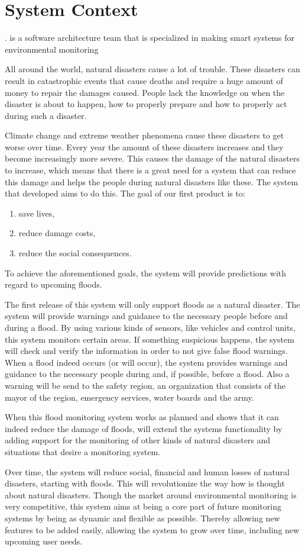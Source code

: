 \chapter{System Context}
\label{ch:context}

\CompanyName. is a software architecture team that is specialized in making smart systems for environmental monitoring

All around the world, natural disasters cause a lot of trouble. These disasters can result in catastrophic events that cause deaths and require a huge amount of money to repair the damages caused. People lack the knowledge on when the disaster is about to happen, how to properly prepare and how to properly act during such a disaster.

Climate change and extreme weather phenomena cause these disasters to get worse over time. Every year the amount of these disasters increases and they become increasingly more severe. This causes the damage of the natural disasters to increase, which means that there is a great need for a system that can reduce this damage and helps the people during natural disasters like these. The system that developed aims to do this.
The goal of our first product is to:
\begin{enumerate}
	\item save lives,
	\item reduce damage costs,
	\item reduce the social consequences.
\end{enumerate}

To achieve the aforementioned goals, the system will provide predictions with regard to upcoming floods.

The first release of this system will only support floods as a natural disaster. The system will provide warnings and guidance to the necessary people before and during a flood. By using various kinds of sensors, like vehicles and control units, this system monitors certain areas. If something suspicious happens, the system will check and verify the information in order to not give false flood warnings. When a flood indeed occurs (or will occur), the system provides warnings and guidance to the necessary people during and, if possible, before a flood. Also a warning will be send to the safety region, an organization that consists of the mayor of the region, emergency services, water boards and the army. 

When this flood monitoring system works as planned and shows that it can indeed reduce the damage of floods, \CompanyName will extend the systems functionality  by adding support for the monitoring of other kinds of natural disasters and situations that desire a monitoring system.

Over time, the system will reduce social, financial and human losses of natural disasters, starting with floods. This will revolutionize the way how is thought about natural disasters. Though the market around environmental monitoring is very competitive, this system aims at being a core part of future monitoring systems by being as dynamic and flexible as possible. Thereby allowing new features to be added easily, allowing the system to grow over time, including new upcoming user needs.